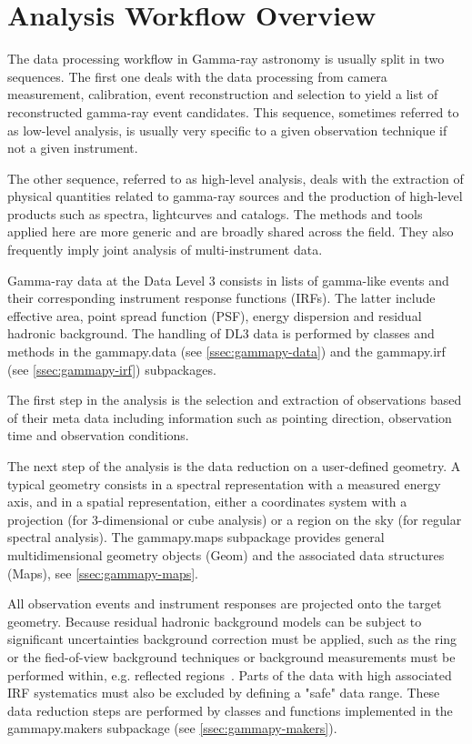 \section{Analysis Workflow Overview}
\label{sec:analysis-workflow-overview}

The data processing workflow in Gamma-ray astronomy is usually split in two sequences.
The first one deals with the data processing from camera measurement, calibration, event
reconstruction and selection to yield a list of reconstructed gamma-ray event candidates.
This sequence, sometimes referred to as low-level analysis, is usually very specific to
a given observation technique if not a given instrument.

The other sequence, referred to as high-level analysis, deals with the extraction of physical
quantities related to gamma-ray sources and the production of high-level products such as spectra,
lightcurves and catalogs. The methods and tools applied here are more generic and are broadly
shared across the field. They also frequently imply joint analysis of multi-instrument data.

Gamma-ray data at the Data Level 3 consists in lists of gamma-like events and their
corresponding instrument response functions (IRFs). The latter include effective area,
point spread function (PSF), energy dispersion and residual hadronic background.
The handling of DL3 data is performed by classes and methods
in the gammapy.data  (see \ref{ssec:gammapy-data}) and the gammapy.irf
(see \ref{ssec:gammapy-irf}) subpackages.

The first step in the analysis is the selection and extraction of observations
based of their meta data including information such as pointing direction, observation
time and observation conditions.

The next step of the analysis is the data reduction on a user-defined geometry.
A typical geometry consists in a spectral representation with a measured
energy axis, and in a spatial representation, either a coordinates system  with a projection
(for 3-dimensional or cube analysis) or a region on the sky (for regular spectral analysis).
The gammapy.maps subpackage provides general multidimensional geometry objects
(Geom) and the associated data structures (Maps), see \ref{ssec:gammapy-maps}.

All observation events and instrument responses are projected onto the
target geometry. Because residual hadronic background models can be subject
to significant uncertainties background correction must be applied,
such as the ring or the fied-of-view background techniques or
background measurements must be performed within, e.g. reflected regions~\citep{Berge07}.
Parts of the data with high associated IRF systematics must also be excluded by defining
a "safe" data range. These data reduction steps are performed by classes and functions
implemented in the gammapy.makers subpackage (see \ref{ssec:gammapy-makers}).

